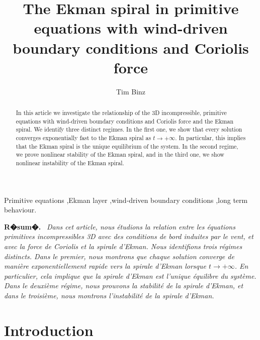 \documentclass[preprint]{elsarticle}
\title{The Ekman spiral in primitive equations with wind-driven boundary conditions and Coriolis force}
\author[1]{Tim Binz
	}
\affiliation[1]{organization={Program in Applied and Computational Mathematics,
		Princeton University},
	addressline={Fine Hall, Washington Road},
	city={Princeton},
	postcode={08544},
	state={New Jersey},
	country={USA}}
\numberwithin{equation}{section}
\newenvironment{resume}[1]
{\par\medskip
	\noindent\textbf{#1.}\ \itshape}
{\par\medskip}
\begin{document}
\begin{keyword}
	Primitive equations \sep Ekman layer \sep wind-driven boundary conditions \sep long term behaviour. 
\end{keyword}

	
\begin{abstract}
	In this article we investigate the relationship 
	of the 3D incompressible, primitive equations 
	with wind-driven boundary conditions and Coriolis force and the Ekman spiral. We identify three distinct regimes. In the first one, we show that every solution converges exponentially fast to the Ekman spiral as $t \to + \infty$. In particular, this implies that the Ekman spiral is the unique equilibrium of the system.
	In the second regime, we prove nonlinear stability of the Ekman spiral, and in the third one, we show nonlinear instability of the Ekman spiral.  
\end{abstract} 


\maketitle	

\begin{resume}{R�sum�}
	Dans cet article, nous \'etudions la relation entre les \'equations primitives incompressibles 3D avec des conditions de bord induites par le vent, et avec la force de Coriolis et la spirale d'Ekman.
	Nous identifions trois r\'egimes distincts.
	Dans le premier, nous montrons que chaque solution converge de mani\`ere exponentiellement rapide vers la spirale d'Ekman lorsque $t \to +\infty$.
	En particulier, cela implique que la spirale d'Ekman est l'unique \'equilibre du syst\`eme.
	Dans le deuxi\`eme r\'egime, nous prouvons la stabilit\'e de la spirale d'Ekman, et dans le troisi\`eme, nous montrons l'instabilit\'e de la spirale d'Ekman. 
\end{resume}


\section{Introduction}
\label{sec:intro_2}
\end{document}
